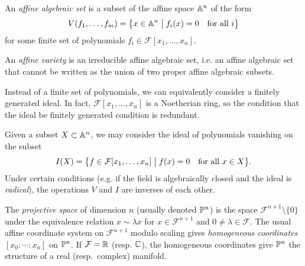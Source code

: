 \documentclass[cclicense]{hmcthesis}
\newcommand*{\F}{\mathcal{F}}
\newcommand*{\vbar}{\;\big\vert\;}
\numberwithin{equation}{chapter}
\numberwithin{thmcounter}{chapter}
\begin{document}
    \begin{definition}
        An \emph{affine algebraic set} is a subset of the affine space $\mathbb{A}^n$
        of the form
        \[
            V(f_1, \ldots, f_m)
            = \cdel[\big]{x \in \A^n \vbar f_i(x) = 0 \quad\text{for all $i$}}
        \]
        for some finite set of polynomials $f_i \in \F[x_1, \ldots, x_n]$.

        An \emph{affine variety} is an irreducible affine algebraic set, i.e. an
        affine algebraic set that cannot be written as the union of two proper
        affine algebraic subsets.
    \end{definition}
    \noindent Instead of a finite set of polynomials, we can equivalently
    consider a finitely generated ideal.  In fact, $\F[x_1,\ldots,x_n]$ is a
    Noetherian ring, so the condition that the ideal be finitely generated
    condition is redundant.

    Given a subset $X \subset \mathbb{A}^n$, we may consider the ideal of polynomials
    vanishing on the subset
    \[
        I(X) = \cdel[\big]{f \in \F[x_1, \ldots, x_n] \vbar f(x) = 0 \quad\text{for
        all $x \in X$}}.
    \]
    Under certain conditions (e.g. if the field is algebraically closed and the
    ideal is \emph{radical}), the operations $V$ and $I$ are inverses of each other.

    \begin{definition}
        The \emph{projective space} of dimension $n$ (usually denoted $\mathbb{P}^n$)
        is the space $\F^{n+1}\setminus \{0\}$ under the equivalence relation $x
        \sim \lambda x$ for $x \in \F^{n+1}$ and $0 \ne \lambda \in \F$.  The
        usual affine coordinate system on $\F^{n+1}$ modulo scaling gives
        \emph{homogeneous coordinates} $[x_0: \cdots: x_n]$ on $\mathbb{P}^n$.  If
        $\F = \R$ (resp.  $\mathbb{C}$), the homogeneous coordinates give $\mathbb{P}^n$ the
        structure of a real (resp.\ complex) manifold.
    \end{definition}
\end{document}
